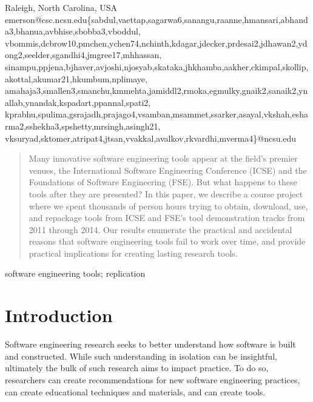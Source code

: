 \documentclass[10pt,conference]{IEEEtran}
\begin{document}
{{Raleigh, North Carolina, USA\\
emerson@csc.ncsu.edu}\{sabdul,vaettap,sagarwa6,sanangu,raanne,hmansari,abhanda3,bhanua,avbhise,sbobba3,vboddul,\\vbommis,dcbrow10,pmchen,ychen74,nchinth,kdagar,jdecker,prdesai2,jdhawan2,ydong2,seelder,sgandhi4,jmgree17,mhhassan,\\sinampu,ppjena,bjhaver,avjoshi,njosyab,skataka,jhkhamba,aakher,ckimpal,skollip,akottal,akumar21,hkumbum,nplimaye,\\amahaja3,smallen3,smanchu,kmmehta,jamiddl2,rmoka,egmulky,gnaik2,sanaik2,ynallab,ynandak,kspadart,ppannal,spati2,\\kprabhu,spulima,gsrajadh,prajago4,vsamban,msammet,ssarker,asayal,vkshah,esharma2,sshekha3,spshetty,mrsingh,asingh21,\\vksuryad,sktomer,atripat4,jtsan,vvakkal,avalkov,rkvardhi,mverma4\}@ncsu.edu}



\maketitle
\begin{abstract}
Many innovative software engineering tools appear at the field's premier venues, the 
International Software Engineering Conference (ICSE) and the 
Foundations of Software Engineering (FSE).
But what happens to these tools after they are presented?
In this paper, we describe a course project where we spent 
thousands of person hours
trying to obtain, download, use, and repackage \totalToolsTried
tools from ICSE and FSE's tool demonstration tracks from
2011 through 2014.
Our results enumerate the practical and accidental reasons that
software engineering tools fail to work over time,
and provide practical implications for creating lasting 
research tools.
\end{abstract}

\begin{IEEEkeywords}
software engineering tools; replication
\end{IEEEkeywords}

\section{Introduction}

Software engineering research seeks to better
understand how software is built and constructed.
While such understanding in isolation can be insightful,
ultimately the bulk of such research 
aims to impact practice.
To do so, researchers can create recommendations
for new software engineering practices, can 
create educational techniques and materials, 
and can create tools.
\end{document}
